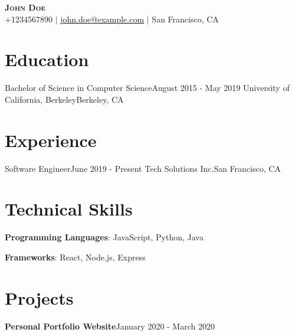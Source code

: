 \begin{center}
\textbf{\Huge \scshape John Doe} \\ \vspace{1pt}
\small +1234567890 $|$ \href{mailto:john.doe@example.com}{\underline{john.doe@example.com}} $|$
San Francisco, CA
\end{center}

\section{Education}
\resumeSubHeadingListStart
\resumeSubheading
{Bachelor of Science in Computer Science}{August 2015 - May 2019}
{University of California, Berkeley}{Berkeley, CA}
\resumeItemListStart
\resumeItemListEnd
\resumeSubHeadingListEnd

\section{Experience}
\resumeSubHeadingListStart
\resumeSubheading
{Software Engineer}{June 2019 - Present}
{Tech Solutions Inc.}{San Francisco, CA}
\resumeItemListStart
\resumeItemListEnd
\resumeSubHeadingListEnd

\section{Technical Skills}
\begin{itemize}[leftmargin=0.15in, label={}]
\small{\item{
\textbf{Programming Languages}{: JavaScript, Python, Java}
}}
\small{\item{
\textbf{Frameworks}{: React, Node.js, Express}
}}
\end{itemize}

\section{Projects}
\resumeSubHeadingListStart
\resumeProjectHeading
{\textbf{Personal Portfolio Website}}{January 2020 - March 2020}
\resumeItemListStart
{}
\resumeItemListEnd
\resumeSubHeadingListEnd
